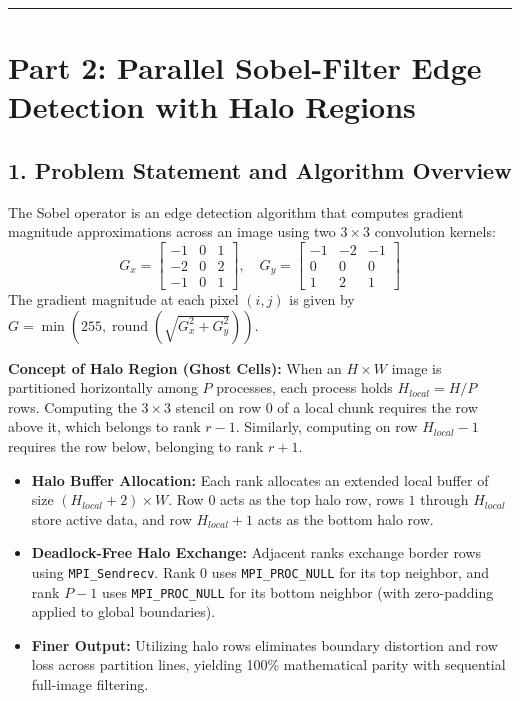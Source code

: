 \documentclass[12pt]{article}
\begin{document}
\vspace{10pt}
\hrule
\vspace{10pt}

\section*{Part 2: Parallel Sobel-Filter Edge Detection with Halo Regions}

\subsection*{1. Problem Statement and Algorithm Overview}
The Sobel operator is an edge detection algorithm that computes gradient magnitude approximations across an image using two $3 \times 3$ convolution kernels:
\begin{equation}
G_x = \begin{bmatrix}
-1 & 0 & 1 \\
-2 & 0 & 2 \\
-1 & 0 & 1
\end{bmatrix}, \quad
G_y = \begin{bmatrix}
-1 & -2 & -1 \\
0 & 0 & 0 \\
1 & 2 & 1
\end{bmatrix}
\end{equation}
The gradient magnitude at each pixel $(i, j)$ is given by $G = \min(255, \operatorname{round}(\sqrt{G_x^2 + G_y^2}))$.

\textbf{Concept of Halo Region (Ghost Cells):}
When an $H \times W$ image is partitioned horizontally among $P$ processes, each process holds $H_{local} = H / P$ rows. Computing the $3 \times 3$ stencil on row 0 of a local chunk requires the row above it, which belongs to rank $r - 1$. Similarly, computing on row $H_{local} - 1$ requires the row below, belonging to rank $r + 1$.
\begin{itemize}
    \item \textbf{Halo Buffer Allocation:} Each rank allocates an extended local buffer of size $(H_{local} + 2) \times W$. Row $0$ acts as the top halo row, rows $1$ through $H_{local}$ store active data, and row $H_{local} + 1$ acts as the bottom halo row.
    \item \textbf{Deadlock-Free Halo Exchange:} Adjacent ranks exchange border rows using \texttt{MPI\_Sendrecv}. Rank 0 uses \texttt{MPI\_PROC\_NULL} for its top neighbor, and rank $P - 1$ uses \texttt{MPI\_PROC\_NULL} for its bottom neighbor (with zero-padding applied to global boundaries).
    \item \textbf{Finer Output:} Utilizing halo rows eliminates boundary distortion and row loss across partition lines, yielding 100\% mathematical parity with sequential full-image filtering.
\end{itemize}
\end{document}
